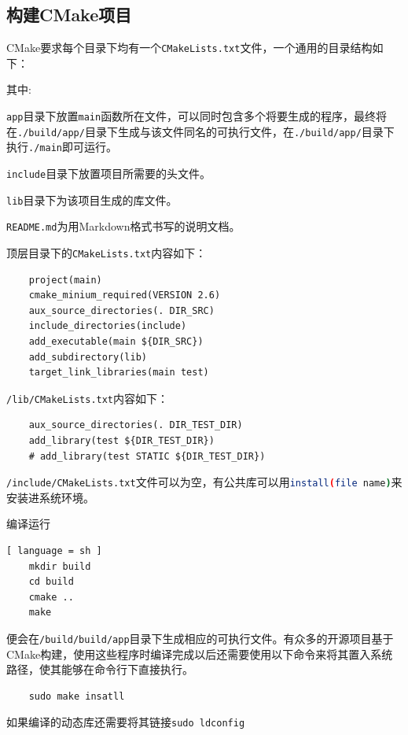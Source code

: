 	\subsection{构建CMake项目}
	\par CMake要求每个目录下均有一个\lstinline{CMakeLists.txt}文件，一个通用的目录结构如下：
	\par\noindent 其中:
	\par\noindent \lstinline{app}目录下放置\lstinline{main}函数所在文件，可以同时包含多个将要生成的程序，最终将在\lstinline{./build/app/}目录下生成与该文件同名的可执行文件，在\lstinline{./build/app/}目录下执行\lstinline{./main}即可运行。
	\par\noindent \lstinline{include}目录下放置项目所需要的头文件。
	\par\noindent \lstinline{lib}目录下为该项目生成的库文件。
	\par\noindent \lstinline{README.md}为用Markdown格式书写的说明文档。
	\par\noindent 顶层目录下的\lstinline{CMakeLists.txt}内容如下：
	\begin{lstlisting}
	project(main)
	cmake_minium_required(VERSION 2.6)
	aux_source_directories(. DIR_SRC)
	include_directories(include)
	add_executable(main ${DIR_SRC})
	add_subdirectory(lib)
	target_link_libraries(main test)
	\end{lstlisting}
	\par\noindent \lstinline{/lib/CMakeLists.txt}内容如下：
	\begin{lstlisting}
	aux_source_directories(. DIR_TEST_DIR)
	add_library(test ${DIR_TEST_DIR})
	# add_library(test STATIC ${DIR_TEST_DIR})
	\end{lstlisting}
	\par\noindent \lstinline{/include/CMakeLists.txt}文件可以为空，有公共库可以用\lstinline[language=sh]{install(file name)}来安装进系统环境。
	\par\noindent 编译运行
	\begin{lstlisting}[ language = sh ]
	mkdir build
	cd build
	cmake ..
	make
	\end{lstlisting}
	\par\noindent 便会在\lstinline{/build/build/app}目录下生成相应的可执行文件。有众多的开源项目基于CMake构建，使用这些程序时编译完成以后还需要使用以下命令来将其置入系统路径，使其能够在命令行下直接执行。
	\begin{lstlisting}
	sudo make insatll
	\end{lstlisting}
	\par\noindent 如果编译的动态库还需要将其链接\lstinline{sudo ldconfig}
